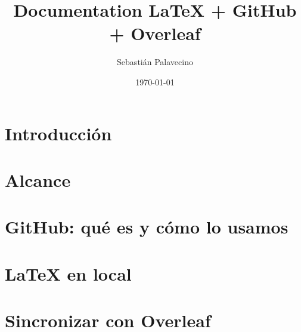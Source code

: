\documentclass[a4paper,12pt]{article}
\title{Documentation LaTeX + GitHub + Overleaf}
\author{Sebastián Palavecino}
\date{\today}
\begin{document}
\maketitle
\tableofcontents

\section{Introducción}


\section{Alcance}


\section{GitHub: qué es y cómo lo usamos}


\section{LaTeX en local}


\section{Sincronizar con Overleaf}


% 
\end{document}
